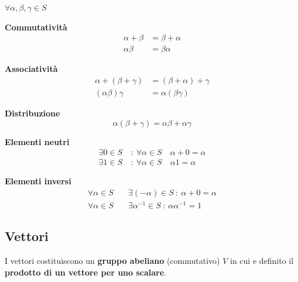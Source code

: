 \documentclass[a4paper, 10pt]{article}
\begin{document}
			\begin{multicols}{2}
				\begin{center}
					$ \forall \alpha,\beta,\gamma \in S $
				
				\noindent
				\textbf{Commutatività}
				\begin{align*}
					\alpha + \beta &= \beta + \alpha \\
					\alpha \beta &= \beta\alpha
				\end{align*}
				
				\textbf{Associatività}
				\begin{align*}
					\alpha + (\beta + \gamma) &= (\beta + \alpha) + \gamma \\
					(\alpha\beta)\gamma &= \alpha(\beta\gamma)
 				\end{align*}
				
				\textbf{Distribuzione}
				\[
					\alpha(\beta + \gamma) = \alpha\beta + \alpha\gamma
				\]
				
				\columnbreak
				
				\textbf{Elementi neutri}
				\begin{align*}
					\exists 0 \in S \: &: \: \forall \alpha \in S \quad \alpha + 0 = \alpha \\
					\exists 1 \in S \: &: \: \forall \alpha \in S \quad \alpha 1 = \alpha 
				\end{align*}
				
				\textbf{Elementi inversi}
				\begin{align*}
				\forall \alpha \in S \quad & \exists (-\alpha) \in S \: : \: \alpha + 0 = \alpha \\
				\forall \alpha \in S \quad & \exists \alpha^{-1} \in S \: : \: \alpha\alpha^{-1} = 1 
				\end{align*}
				\end{center}
			\end{multicols}
			
		\subsection{Vettori}
			I vettori costituiscono un \textbf{gruppo
			abeliano} (commutativo) $ V $ in cui e
			definito il \textbf{prodotto di un vettore
			per uno scalare}.
		
\end{document}
